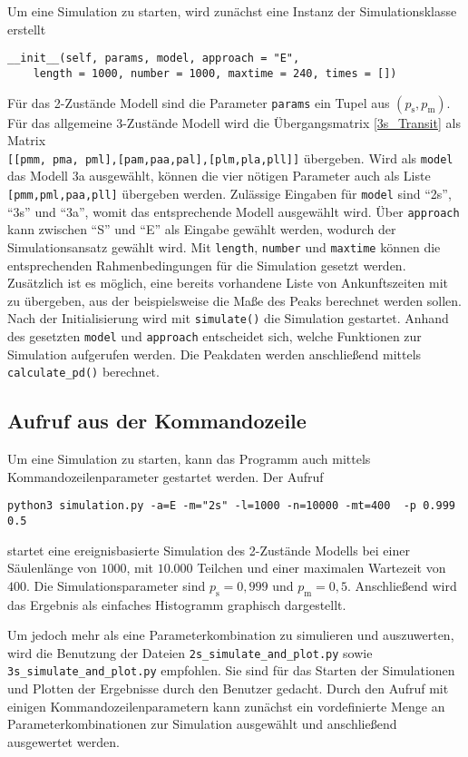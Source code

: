 Um eine Simulation zu starten, wird zunächst eine Instanz der Simulationsklasse erstellt
\begin{verbatim}
__init__(self, params, model, approach = "E",
	length = 1000, number = 1000, maxtime = 240, times = [])
\end{verbatim}                                                                                                  
Für das 2-Zustände Modell sind die Parameter \verb!params! ein Tupel aus $(p_\text{s}, p_\text{m})$. Für das allgemeine 3-Zustände Modell wird die Übergangsmatrix \ref{3s_Transit} als Matrix \\ \verb![[pmm, pma, pml],[pam,paa,pal],[plm,pla,pll]]! übergeben. Wird als \verb!model! das Modell 3a ausgewählt, können die vier nötigen Parameter auch als Liste \verb![pmm,pml,paa,pll]! übergeben werden.
Zulässige Eingaben für \verb!model! sind ``2s'', ``3s'' und ``3a'', womit das entsprechende Modell ausgewählt wird. Über \verb!approach! kann zwischen ``S'' und ``E'' als Eingabe gewählt werden, wodurch der Simulationsansatz gewählt wird.
Mit \verb!length!, \verb!number! und \verb!maxtime! können die entsprechenden Rahmenbedingungen für die Simulation gesetzt werden. Zusätzlich ist es möglich, eine bereits vorhandene Liste von Ankunftszeiten mit zu übergeben, aus der beispielsweise die Maße des Peaks berechnet werden sollen.
Nach der Initialisierung wird mit \verb!simulate()! die Simulation gestartet. Anhand des gesetzten \verb!model! und \verb!approach! entscheidet sich, welche Funktionen zur Simulation aufgerufen werden. Die Peakdaten werden anschließend mittels \verb!calculate_pd()! berechnet.

\subsection{Aufruf aus der Kommandozeile}
Um eine Simulation zu starten, kann das Programm auch mittels Kommandozeilenparameter gestartet werden. Der Aufruf
\begin{verbatim}
python3 simulation.py -a=E -m="2s" -l=1000 -n=10000 -mt=400  -p 0.999 0.5
\end{verbatim}
startet eine ereignisbasierte Simulation des 2-Zustände Modells bei einer Säulenlänge von $1000$, mit $10.000$ Teilchen und einer maximalen Wartezeit von $400$. Die Simulationsparameter sind $p_\text{s} = 0,999$ und $p_\text{m} = 0,5$. Anschließend wird das Ergebnis als einfaches Histogramm graphisch dargestellt.

Um jedoch mehr als eine Parameterkombination zu simulieren und auszuwerten, wird die Benutzung der Dateien \verb!2s_simulate_and_plot.py! sowie  \verb!3s_simulate_and_plot.py! empfohlen. Sie sind für das Starten der Simulationen und Plotten der Ergebnisse durch den Benutzer gedacht. Durch den Aufruf mit einigen Kommandozeilenparametern kann zunächst ein vordefinierte Menge an Parameterkombinationen zur Simulation ausgewählt und anschließend ausgewertet werden.

